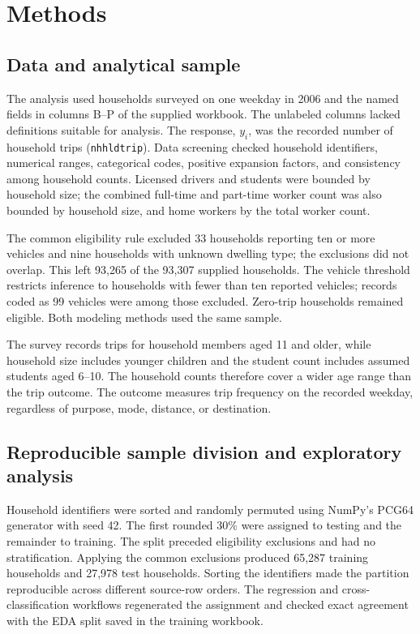 \section{Methods}
\label{sec:methods}

\subsection{Data and analytical sample}
The analysis used households surveyed on one weekday in 2006 and the named fields in columns B--P of the supplied workbook. The unlabeled columns lacked definitions suitable for analysis. The response, $y_i$, was the recorded number of household trips (\texttt{nhhldtrip}). Data screening checked household identifiers, numerical ranges, categorical codes, positive expansion factors, and consistency among household counts. Licensed drivers and students were bounded by household size; the combined full-time and part-time worker count was also bounded by household size, and home workers by the total worker count.

The common eligibility rule excluded 33 households reporting ten or more vehicles and nine households with unknown dwelling type; the exclusions did not overlap. This left 93,265 of the 93,307 supplied households. The vehicle threshold restricts inference to households with fewer than ten reported vehicles; records coded as 99 vehicles were among those excluded. Zero-trip households remained eligible. Both modeling methods used the same sample.

The survey records trips for household members aged 11 and older, while household size includes younger children and the student count includes assumed students aged 6--10. The household counts therefore cover a wider age range than the trip outcome. The outcome measures trip frequency on the recorded weekday, regardless of purpose, mode, distance, or destination.

\subsection{Reproducible sample division and exploratory analysis}
Household identifiers were sorted and randomly permuted using NumPy's PCG64 generator with seed 42. The first rounded 30\% were assigned to testing and the remainder to training. The split preceded eligibility exclusions and had no stratification. Applying the common exclusions produced 65,287 training households and 27,978 test households. Sorting the identifiers made the partition reproducible across different source-row orders. The regression and cross-classification workflows regenerated the assignment and checked exact agreement with the EDA split saved in the training workbook.

